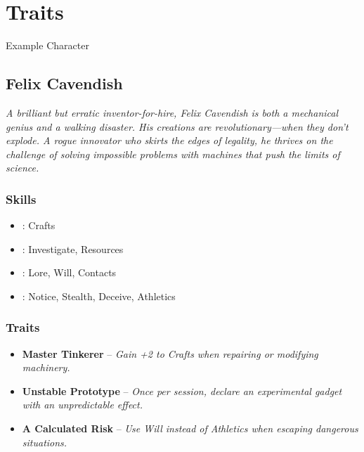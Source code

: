 \section{Traits}
\label{core:traits}

\begin{DndSidebar}[float=!t]{Example Character}
	\subsection{Felix Cavendish}
	\emph{A brilliant but erratic inventor-for-hire, Felix Cavendish is both a mechanical genius and a walking disaster. His creations are revolutionary—when they don’t explode. A rogue innovator who skirts the edges of legality, he thrives on the challenge of solving impossible problems with machines that push the limits of science.}

	\subsubsection*{Skills}
	\begin{itemize}
    	\item \Expert: Crafts
	    \item \Skilled: Investigate, Resources
    	\item \Novice: Lore, Will, Contacts
	    \item \Untrained: Notice, Stealth, Deceive, Athletics
	\end{itemize}

	\subsubsection*{Traits}
	\begin{itemize}
    	\item \textbf{Master Tinkerer} – \emph{Gain +2 to Crafts when repairing or modifying machinery.}
	    \item \textbf{Unstable Prototype} – \emph{Once per session, declare an experimental gadget with an unpredictable effect.}
    	\item \textbf{A Calculated Risk} – \emph{Use Will instead of Athletics when escaping dangerous situations.}
	\end{itemize}
\end{DndSidebar}
